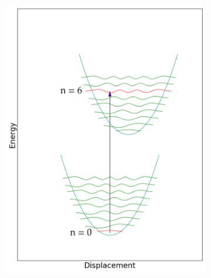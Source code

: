 \documentclass[12pt, fleqn]{beamer}
\begin{document}
\begin{frame}
\begin{overlayarea}{\textwidth}{14cm}
{\begin{figure}[h!]
\begin{subfigure}[b]{0.45\linewidth}
                    \includegraphics[width=\linewidth]{fc/tr_6.png}
                \end{subfigure}
                \begin{subfigure}[b]{0.45\linewidth}

\end{subfigure}
\end{figure}}
\end{overlayarea}
\end{frame}
\end{document}
